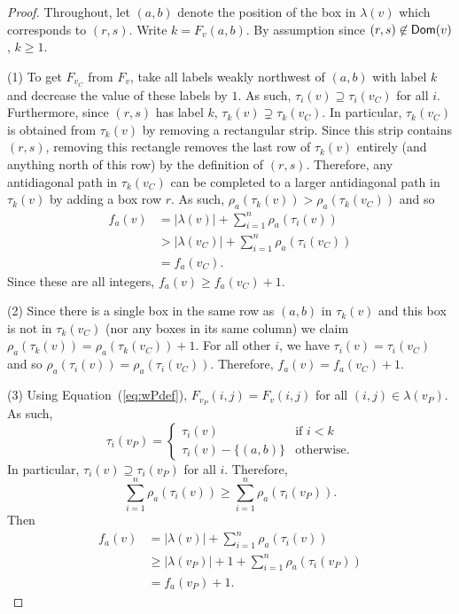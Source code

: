 \documentclass[12pt]{amsart}
\theoremstyle{definition}
\theoremstyle{remark}
\numberwithin{equation}{section}
\newcommand{\maxsizeantidiag}{\rho_a}
\newcommand{\antidiagstat}{f_a}
\begin{document}
\begin{proof}
Throughout, let $(a,b)$ denote the position of the box in $\lambda(v)$ which corresponds to $(r,s)$. Write $k=F_v(a,b)$.  By assumption since $(r,s)\not\in{\sf Dom}(v)$, $k\geq 1$.

\noindent (1) To get $F_{v_C}$ from $F_v$, take all labels weakly northwest of $(a,b)$ with label $k$ and decrease the value of these labels by $1$.  As such, $\tau_i(v)\supseteq \tau_i(v_C)$ for all $i$.  Furthermore, since $(r,s)$ has label $k$, $\tau_k(v)\supsetneq \tau_k(v_C)$.  
In particular,  $\tau_k(v_C)$ is obtained from $\tau_k(v)$ by removing a rectangular strip.  Since this strip contains $(r,s)$, removing this rectangle removes the last row of $\tau_k(v)$ entirely (and anything north of this row) by the definition of $(r,s)$.
Therefore, any antidiagonal path in $\tau_k(v_C)$ can be completed to a larger antidiagonal path in $\tau_k(v)$ by adding a box row $r$.  As such, $\maxsizeantidiag(\tau_k(v))>\maxsizeantidiag(\tau_k(v_C))$ and so
\begin{align*}
\antidiagstat(v)&=|\lambda(v)|+\sum_{i=1}^n \maxsizeantidiag(\tau_i(v))\\
&> |\lambda(v_C)|+\sum_{i=1}^n \maxsizeantidiag(\tau_i(v_C))\\
&=\antidiagstat(v_C).
\end{align*}
Since these are all integers, $\antidiagstat(v)\geq \antidiagstat(v_C)+1$.

\noindent (2) Since there is a single box in the same row as $(a,b)$ in $\tau_k(v)$ and this box is not in $\tau_k(v_C)$ (nor any boxes in its same column) we claim $\maxsizeantidiag(\tau_k(v))=\maxsizeantidiag(\tau_k(v_C))+1$.  For all other $i$, we have $\tau_i(v)=\tau_i(v_C)$ and so $\maxsizeantidiag(\tau_i(v))=\maxsizeantidiag(\tau_i(v_C))$.
  Therefore, $\antidiagstat(v)=\antidiagstat(v_C)+1$.

\noindent (3)  Using Equation~(\ref{eq:wPdef}), $F_{v_P}(i,j)=F_v(i,j)$ for all $(i,j)\in \lambda(v_P)$.  As such, 
\begin{equation}
\label{eqn:pivotequalities}
\tau_i(v_P)=
\begin{cases}
 \tau_i(v) &\text{if } i<k\\
\tau_i(v)-\{(a,b)\} &\text{otherwise}.
\end{cases}
\end{equation}
In particular, $\tau_i(v)\supseteq \tau_i(v_P)$ for all $i$.
 Therefore, \[\sum_{i=1}^n \maxsizeantidiag(\tau_i(v)) \geq \sum_{i=1}^n\maxsizeantidiag(\tau_i(v_P)).\]
Then
\begin{align*}
\antidiagstat(v)&=|\lambda(v)|+\sum_{i=1}^n \maxsizeantidiag(\tau_i(v))\\
&\geq |\lambda(v_P)|+1+\sum_{i=1}^n \maxsizeantidiag(\tau_i(v_P))\\
&=\antidiagstat(v_P)+1.
\end{align*}




\end{proof}
\end{document}
